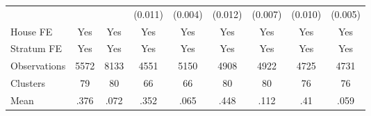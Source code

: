 {\begin{tabular}{l*{8}{c}}
                &                  &                  &  (0.011)         &  (0.004)         &  (0.012)         &  (0.007)         &  (0.010)         &  (0.005)         \\
House FE        &      Yes         &      Yes         &      Yes         &      Yes         &      Yes         &      Yes         &      Yes         &      Yes         \\
Stratum FE      &      Yes         &      Yes         &      Yes         &      Yes         &      Yes         &      Yes         &      Yes         &      Yes         \\
\midrule
Observations    &     5572         &     8133         &     4551         &     5150         &     4908         &     4922         &     4725         &     4731         \\
Clusters        &       79         &       80         &       66         &       66         &       80         &       80         &       76         &       76         \\
Mean            &     .376         &     .072         &     .352         &     .065         &     .448         &     .112         &      .41         &     .059         \\
\bottomrule
\end{tabular}
}
